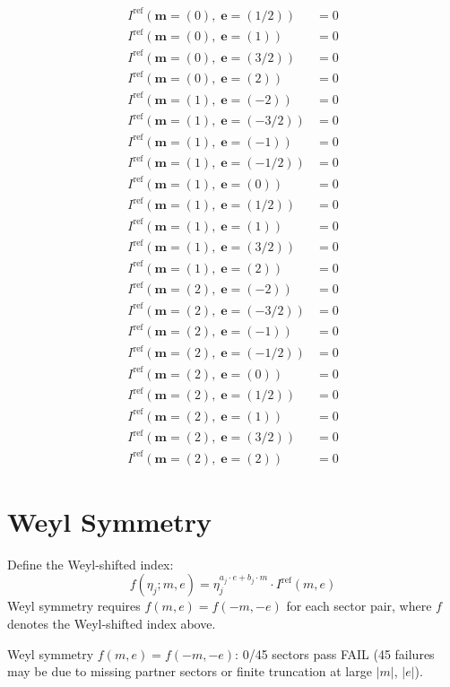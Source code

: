 \documentclass[11pt,a4paper]{article}
\newcommand{\Iref}{I^{\mathrm{ref}}}
\newcommand{\failmark}{\textcolor{fail}{FAIL}}
\begin{document}
\begin{align*}
  \Iref(\mathbf{m}=(0),\;\mathbf{e}=(1/2)) &= 0 \\
  \Iref(\mathbf{m}=(0),\;\mathbf{e}=(1)) &= 0 \\
  \Iref(\mathbf{m}=(0),\;\mathbf{e}=(3/2)) &= 0 \\
  \Iref(\mathbf{m}=(0),\;\mathbf{e}=(2)) &= 0 \\
  \Iref(\mathbf{m}=(1),\;\mathbf{e}=(-2)) &= 0 \\
  \Iref(\mathbf{m}=(1),\;\mathbf{e}=(-3/2)) &= 0 \\
  \Iref(\mathbf{m}=(1),\;\mathbf{e}=(-1)) &= 0 \\
  \Iref(\mathbf{m}=(1),\;\mathbf{e}=(-1/2)) &= 0 \\
  \Iref(\mathbf{m}=(1),\;\mathbf{e}=(0)) &= 0 \\
  \Iref(\mathbf{m}=(1),\;\mathbf{e}=(1/2)) &= 0 \\
  \Iref(\mathbf{m}=(1),\;\mathbf{e}=(1)) &= 0 \\
  \Iref(\mathbf{m}=(1),\;\mathbf{e}=(3/2)) &= 0 \\
  \Iref(\mathbf{m}=(1),\;\mathbf{e}=(2)) &= 0 \\
  \Iref(\mathbf{m}=(2),\;\mathbf{e}=(-2)) &= 0 \\
  \Iref(\mathbf{m}=(2),\;\mathbf{e}=(-3/2)) &= 0 \\
  \Iref(\mathbf{m}=(2),\;\mathbf{e}=(-1)) &= 0 \\
  \Iref(\mathbf{m}=(2),\;\mathbf{e}=(-1/2)) &= 0 \\
  \Iref(\mathbf{m}=(2),\;\mathbf{e}=(0)) &= 0 \\
  \Iref(\mathbf{m}=(2),\;\mathbf{e}=(1/2)) &= 0 \\
  \Iref(\mathbf{m}=(2),\;\mathbf{e}=(1)) &= 0 \\
  \Iref(\mathbf{m}=(2),\;\mathbf{e}=(3/2)) &= 0 \\
  \Iref(\mathbf{m}=(2),\;\mathbf{e}=(2)) &= 0
\end{align*}

\section{Weyl Symmetry}
Define the Weyl-shifted index:
\[
  f(\eta_j; m, e) = \eta_j^{a_j \cdot e + b_j \cdot m} \cdot \Iref(m, e)
\]
Weyl symmetry requires $f(m, e) = f(-m, -e)$ for each sector pair, where $f$ denotes the Weyl-shifted index above.

Weyl symmetry $f(m,e)=f(-m,-e)$: 0/45 sectors pass \failmark
 (45 failures may be due to missing partner sectors or finite truncation at large $|m|$, $|e|$).
\end{document}
